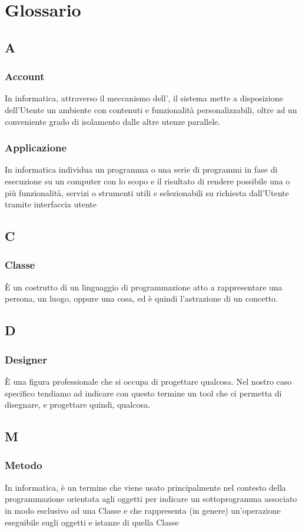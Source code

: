 \section{Glossario}
	\subsection{A}
		\subsubsection{Account}
			In informatica, attraverso il meccanismo dell', il sistema mette a disposizione dell'Utente un ambiente con contenuti e funzionalità personalizzabili, oltre ad un conveniente grado di isolamento dalle altre utenze parallele.
		\subsubsection{Applicazione}
			In informatica individua un programma o una serie di programmi in fase di esecuzione su un computer con lo scopo e il risultato di rendere possibile una o più funzionalità, servizi o strumenti utili e selezionabili su richiesta dall'Utente tramite interfaccia utente
	\subsection{C}
		\subsubsection{Classe}
			È un costrutto di un linguaggio di programmazione atto a rappresentare una persona, un luogo, oppure una cosa, ed è quindi l'astrazione di un concetto.
	\subsection{D}
		\subsubsection{Designer}
			È una figura professionale che si occupa di progettare qualcosa. Nel nostro caso specifico tendiamo ad indicare con questo termine un tool che ci permetta
			di disegnare, e progettare quindi, qualcosa.
	\subsection{M}
		\subsubsection{Metodo}
			In informatica, è un termine che viene usato principalmente nel contesto della programmazione orientata agli oggetti per indicare un sottoprogramma associato in modo esclusivo ad una Classe e che rappresenta (in genere) un'operazione eseguibile sugli oggetti e istanze di quella Classe
